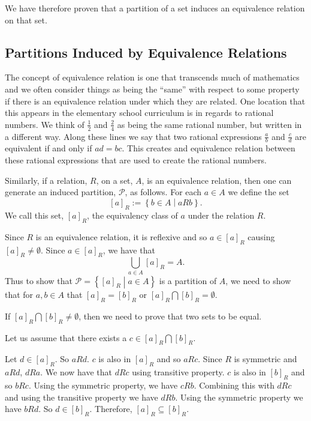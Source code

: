 \documentclass[
]{book}
\theoremstyle{definition}
\theoremstyle{definition}
\theoremstyle{definition}
\theoremstyle{definition}
\theoremstyle{remark}
\begin{document}
We have therefore proven that a partition of a set induces an equivalence relation on that set.

\hypertarget{partitions-induced-by-equivalence-relations}{%
\subsection{Partitions Induced by Equivalence Relations}\label{partitions-induced-by-equivalence-relations}}

The concept of equivalence relation is one that transcends much of mathematics and we often consider things as being the ``same'' with respect to some property if there is an equivalence relation under which they are related. One location that this appears in the elementary school curriculum is in regards to rational numbers. We think of \(\frac{1}{2}\) and \(\frac{2}{4}\) as being the same rational number, but written in a different way. Along these lines we say that two rational expressions \(\frac{a}{b}\) and \(\frac{c}{d}\) are equivalent if and only if \(ad=bc\). This creates and equivalence relation between these rational expressions that are used to create the rational numbers.

Similarly, if a relation, \(R\), on a set, \(A\), is an equivalence relation, then one can generate an induced partition, \(\mathcal{P}\), as follows. For each \(a\in A\) we define the set \[[a]_R := \left\{ b\in A \middle \vert aRb\right\}.\] We call this set, \([a]_R\), the equivalency class of \(a\) under the relation \(R\).

Since \(R\) is an equivalence relation, it is reflexive and so \(a \in [a]_R\) causing \([a]_R \neq \emptyset\). Since \(a\in [a]_R\), we have that \[\bigcup_{a\in A} [a]_R = A.\] Thus to show that \(\mathcal{P} = \left\{ [a]_R \middle \vert a \in A\right\}\) is a partition of \(A\), we need to show that for \(a,b\in A\) that \([a]_R=[b]_R\) or \([a]_R\bigcap [b]_R = \emptyset\).

If \([a]_R \bigcap [b]_R \neq \emptyset\), then we need to prove that two sets to be equal.

Let us assume that there exists a \(c\in [a]_R \bigcap [b]_R\).

Let \(d\in [a]_R\). So \(a R d\). \(c\) is also in \([a]_R\) and so \(aRc\). Since \(R\) is symmetric and \(aRd\), \(dRa\). We now have that \(dR c\) using transitive property. \(c\) is also in \([b]_R\) and so \(bRc\). Using the symmetric property, we have \(cR b\). Combining this with \(dRc\) and using the transitive property we have \(dR b\). Using the symmetric property we have \(bR d\). So \(d\in [b]_R\). Therefore, \([a]_R \subseteq [b]_R\).
\end{document}
